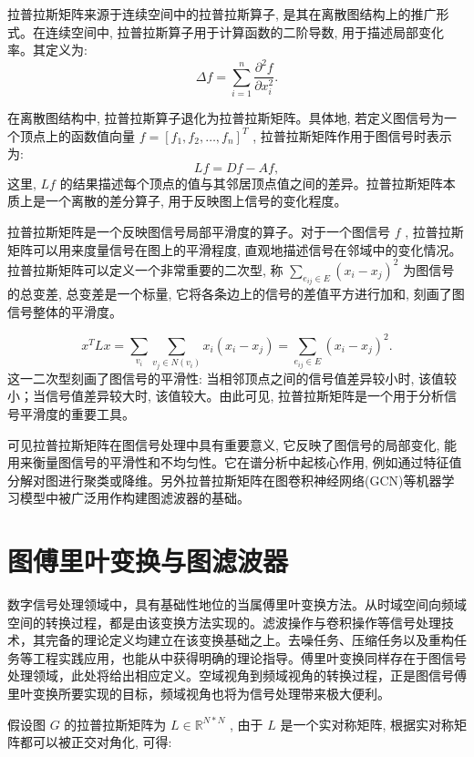 拉普拉斯矩阵来源于连续空间中的拉普拉斯算子, 是其在离散图结构上的推广形式。在连续空间中, 拉普拉斯算子用于计算函数的二阶导数, 用于描述局部变化率。其定义为:
\[
\Delta {f} = \sum\limits_{{i = 1}}^{{n}}\frac{{\partial }^{2}f}{\partial {x}_i^{2}}.
\]

在离散图结构中, 拉普拉斯算子退化为拉普拉斯矩阵。具体地, 若定义图信号为一个顶点上的函数值向量 \({f} = {\left\lbrack  {f}_1, {f}_2, \ldots , {f}_{n}\right\rbrack  }^{{T}}\) , 拉普拉斯矩阵作用于图信号时表示为:
\[
{{Lf}} = {{Df}} - {{Af}}, 
\]
这里, \({{Lf}}\) 的结果描述每个顶点的值与其邻居顶点值之间的差异。拉普拉斯矩阵本质上是一个离散的差分算子, 用于反映图上信号的变化程度。

拉普拉斯矩阵是一个反映图信号局部平滑度的算子。对于一个图信号 \({f}\) , 拉普拉斯矩阵可以用来度量信号在图上的平滑程度, 直观地描述信号在邻域中的变化情况。拉普拉斯矩阵可以定义一个非常重要的二次型, 称 \(\sum\limits_{{{e}_{ij} \in  E}}{\left( {x}_i - {x}_j\right) }^{2}\) 为图信号的总变差, 总变差是一个标量, 它将各条边上的信号的差值平方进行加和, 刻画了图信号整体的平滑度。

\[
{x}^{T}{Lx} = \sum\limits_{{v}_i}\sum\limits_{{{v}_j \in  N\left( {v}_i\right) }}{x}_i\left( {{x}_i - {x}_j}\right)  = \sum\limits_{{{e}_{ij} \in  E}}{\left( {x}_i - {x}_j\right) }^{2}.
\]
这一二次型刻画了图信号的平滑性: 当相邻顶点之间的信号值差异较小时, 该值较小；当信号值差异较大时, 该值较大。由此可见, 拉普拉斯矩阵是一个用于分析信号平滑度的重要工具。

可见拉普拉斯矩阵在图信号处理中具有重要意义, 它反映了图信号的局部变化, 能用来衡量图信号的平滑性和不均匀性。它在谱分析中起核心作用, 例如通过特征值分解对图进行聚类或降维。另外拉普拉斯矩阵在图卷积神经网络(GCN)等机器学习模型中被广泛用作构建图滤波器的基础。



\section{图傅里叶变换与图滤波器}

数字信号处理领域中，具有基础性地位的当属傅里叶变换方法。从时域空间向频域空间的转换过程，都是由该变换方法实现的。滤波操作与卷积操作等信号处理技术，其完备的理论定义均建立在该变换基础之上。去噪任务、压缩任务以及重构任务等工程实践应用，也能从中获得明确的理论指导。傅里叶变换同样存在于图信号处理领域，此处将给出相应定义。空域视角到频域视角的转换过程，正是图信号傅里叶变换所要实现的目标，频域视角也将为信号处理带来极大便利。

假设图 \({G}\) 的拉普拉斯矩阵为 \({L} \in  \mathbb{R}^{N * N}\) , 由于 \({L}\) 是一个实对称矩阵, 根据实对称矩阵都可以被正交对角化, 可得:

